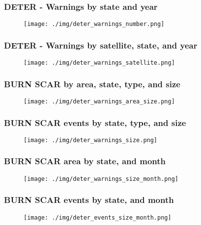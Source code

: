 \documentclass{beamer}
\begin{document}
\begin{frame}
    \frametitle{DETER - Warnings by state and year}
    \begin{figure}
        \centering
        \texttt{[image: ./img/deter\_warnings\_number.png]}
    \end{figure}
\end{frame}

\begin{frame}
    \frametitle{DETER - Warnings by satellite, state, and year}
    \begin{figure}
        \centering
        \texttt{[image: ./img/deter\_warnings\_satellite.png]}
    \end{figure}
\end{frame}



\begin{frame}
    \frametitle{BURN SCAR by area, state, type, and size}
    \begin{figure}
        \centering
        \texttt{[image: ./img/deter\_warnings\_area\_size.png]}
    \end{figure}
\end{frame}

\begin{frame}
    \frametitle{BURN SCAR events by state, type, and size}
    \begin{figure}
        \centering
        \texttt{[image: ./img/deter\_warnings\_size.png]}
    \end{figure}
\end{frame}

\begin{frame}
    \frametitle{BURN SCAR area by state, and month}
    \begin{figure}
        \centering
        \texttt{[image: ./img/deter\_warnings\_size\_month.png]}
    \end{figure}
\end{frame}

\begin{frame}
    \frametitle{BURN SCAR events by state, and month}
    \begin{figure}
        \centering
        \texttt{[image: ./img/deter\_events\_size\_month.png]}
    \end{figure}
\end{frame}
  
\end{document}
